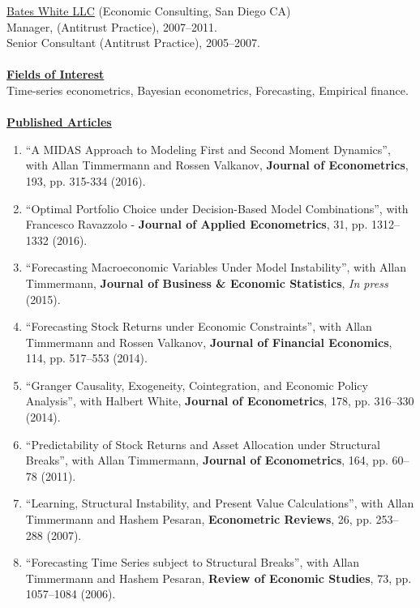\documentclass[11pt]{article}
\begin{document}
\underline{Bates White LLC} (Economic Consulting, San Diego CA)\\
Manager, (Antitrust Practice), 2007--2011.\\
Senior Consultant (Antitrust Practice), 2005--2007. \\ \\
\underline{\textbf{Fields of Interest}}\\
Time-series econometrics, Bayesian econometrics, Forecasting, Empirical finance.\\ \\
\underline{\textbf{Published Articles}}
\begin{enumerate}	

	\item ``A MIDAS Approach to Modeling First and Second Moment Dynamics'', with Allan Timmermann and Rossen Valkanov, \textbf{Journal of Econometrics}, 193, pp. 315-334 (2016).
	\item ``Optimal Portfolio Choice under Decision-Based Model Combinations'', with Francesco Ravazzolo - \textbf{Journal of Applied Econometrics}, 31, pp. 1312--1332 (2016).
	  \item ``Forecasting Macroeconomic Variables Under Model Instability'', with Allan Timmermann, \textbf{Journal of Business \& Economic Statistics},  \textit{In press} (2015). 
	\item ``Forecasting Stock Returns under Economic Constraints'', with Allan Timmermann and Rossen Valkanov, \textbf{Journal of Financial Economics}, 114, pp. 517--553 (2014). 
	\item ``Granger Causality, Exogeneity, Cointegration, and Economic Policy Analysis'', with Halbert White, \textbf{Journal of Econometrics}, 178, pp. 316--330 (2014). 
	\item ``Predictability of Stock Returns and Asset Allocation under Structural Breaks'', with Allan Timmermann, \textbf{Journal of Econometrics}, 164, pp. 60--78 (2011). 
	\item ``Learning, Structural Instability, and Present Value Calculations'', with Allan Timmermann and Hashem Pesaran, \textbf{Econometric Reviews}, 26, pp. 253--288 (2007). 
	\item ``Forecasting Time Series subject to Structural Breaks'', with Allan Timmermann and Hashem Pesaran, \textbf{Review of Economic Studies}, 73, pp. 1057--1084 (2006). 

    \setcounter{enumTemp}{\theenumi}
 \end{enumerate}
\end{document}
